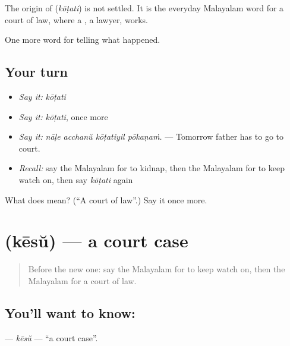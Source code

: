 \begin{cousinweb}
The origin of \textbf{} (\emph{kōṭati}) is not settled. It is the everyday Malayalam word for a court of law, where a , a lawyer, works.
\end{cousinweb}

\begin{grammarlens}[title={What you've built}]
One more word for telling what happened.
\end{grammarlens}

\subsection*{Your turn}
\begin{itemize}
\raggedright
  \item \emph{Say it:} \emph{kōṭati}
  \item \emph{Say it:} \emph{kōṭati}, once more
  \item \emph{Say it:} \emph{nāḷe acchanŭ kōṭatiyil pōkaṇaṁ.} — Tomorrow father has to go to court.
  \item \emph{Recall:} say the Malayalam for to kidnap, then the Malayalam for to keep watch on, then say \emph{kōṭati} again
\end{itemize}

\begin{tcolorbox}[breakable,colback=teal!4,colframe=teal!35!black,title={Before you move on}]
What does  mean? (\textquotedblleft{}A court of law\textquotedblright{}.) Say it once more.
\end{tcolorbox}
\section[\texorpdfstring{\ml{കേസ്} (kēsŭ)}{കേസ് (kēsŭ)}]{ (kēsŭ) — a court case}

\label{lesson:ML-C368-kesu}



\begin{quote}
Before the new one: say the Malayalam for to keep watch on, then the Malayalam for a court of law.
\end{quote}

\subsection*{You'll want to know: }
\textbf{} — \emph{kēsŭ} — \textquotedblleft{}a court case\textquotedblright{}.

